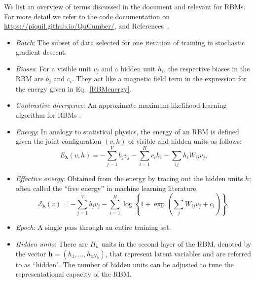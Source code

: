 \documentclass[submission, Phys, hidelnks]{SciPost}
\begin{document}
We list an overview of terms discussed in the document and relevant for RBMs. For more detail we refer to the code documentation on \url{https://piquil.github.io/QuCumber/}, and References~\cite{hinton2002training, hinton2012practical}.

\begin{itemize}

\item {\it Batch}: The subset of data selected for one iteration of training in stochastic gradient descent.

\item {\it Biases}: For a visible unit $v_j$ and a hidden unit $h_i$, the respective biases in the RBM are $b_j$ and $c_i$. They act like a magnetic field term in the expression for the energy given in Eq.~\eqref{RBMenergy}.

\item {\it Contrastive divergence}: An approximate maximum-likelihood learning algorithm for RBMs \cite{hinton2002training}.

\item {\it Energy}: In analogy to statistical physics, the energy of an RBM is defined given the joint configuration $(v, h)$ of visible and hidden units as follows:
\begin{equation}
   E_{\bm{\lambda}}(v,h) = - \sum\limits_{j=1}^V b_j v_j - \sum\limits_{i=1}^H c_i h_i - \sum\limits_{ij} h_i W_{ij} v_j, \label{RBMenergy}
\end{equation}

\item {\it Effective energy}: Obtained from the energy by tracing out the hidden units $h$; often called the ``free energy'' in machine learning literature.
\begin{equation}
   \mathcal{E}_{\bm{\lambda}}(v) = - \sum\limits_{j=1}^V b_j v_j - \sum\limits_{i=1}^H \log \left\{ 1 + \exp \left( \sum\limits_{j} W_{ij}v_j +c_i\right) \right\}, \label{RBMeffectiveenergy}
\end{equation}

\item {\it Epoch}: A single pass through an entire training set.

\item {\it Hidden units}: There are $H_h$ units in the second layer of the RBM, denoted by the vector $\mathbf{h}=(h_1, ..., h_{zN_h})$, that represent latent variables and are referred to as ``hidden". The number of hidden units can be adjusted to tune the representational capacity of the RBM.


\end{itemize}
\end{document}
